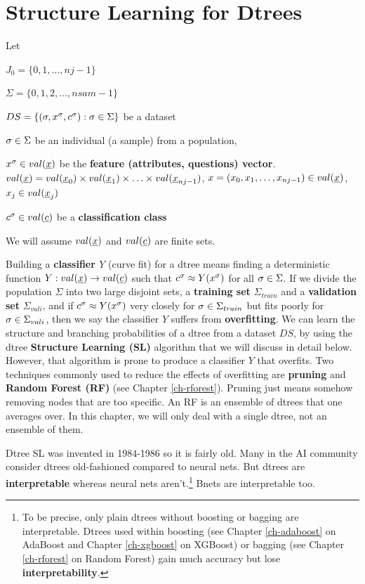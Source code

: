 \section{Structure Learning for  Dtrees}\label{sec-dtree-sl}



Let

$J_0=\{0,1, \ldots, nj-1\}$

$\Sigma=\{0,1,2, \ldots,nsam-1\}$

$DS=\{(\sigma, x^\sigma, c^\sigma): \sigma\in \Sigma\}$ be a dataset

$\sigma\in \Sigma$ be an individual (a sample)
from a population, 

$x^\s\in val(\rvx)$ be the {\bf
feature (attributes, questions) vector}.
$val(\rvx)= val(\rvx_0)\times val(\rvx_1)
\times\ldots\times val(\rvx_{nj-1})$,
$x=(x_0, x_1, \ldots, x_{nj-1})\in val(\rvx)$,
$x_j\in val(\rvx_j)$


$c^\s\in val(\rvc)$ be a {\bf classification class}

We will
assume $val(\rvx)$ and $val(\rvc)$ are finite sets.

Building a {\bf classifier $Y$} 
(curve fit) for a dtree means
finding a deterministic
function $Y:val(\rvx)\rarrow val(\rvc)$
such that 
$c^\sigma \approx Y(x^\sigma)$
for all $\sigma\in \Sigma$.
If we divide
the population
$\Sigma$ 
into two large 
disjoint
sets, a {\bf training set} $\Sigma_{train}$
and a {\bf validation set} $\Sigma_{vali}$,
and if $c^\sigma \approx Y(x^\sigma)$ very closely
for $\sigma\in \Sigma_{train}$
but fits poorly
for $\sigma\in \Sigma_{vali}$,
then we say the classifier  $Y$
suffers from {\bf overfitting}.
We can learn the structure
and branching probabilities of a dtree from a dataset $DS$,
by using the
dtree {\bf Structure Learning (SL)}
algorithm that we will 
discuss in detail below. However,
that algorithm
is prone to produce
a classifier $Y$ that overfits.
Two techniques 
commonly used to 
reduce the effects of overfitting
are {\bf pruning}  and 
{\bf Random Forest (RF)}
(see Chapter \ref{ch-rforest}).
Pruning just means somehow
removing nodes that are
too specific. 
An RF is an ensemble of dtrees 
that one averages over.
In this chapter, we will only deal
with a single dtree,
not an ensemble of them. 

Dtree SL was invented in 1984-1986 so it
is fairly old.
Many in the AI
community 
consider dtrees old-fashioned
compared to neural nets.
But dtrees 
are {\bf interpretable} whereas neural nets aren't.\footnote{
To be precise, only
plain dtrees without boosting or
 bagging
are interpretable.
Dtrees used within boosting
(see Chapter \ref{ch-adaboost} on AdaBoost
and
Chapter \ref{ch-xgboost} on XGBoost)
or bagging
(see Chapter \ref{ch-rforest} on Random Forest)
gain much
accuracy but lose
{\bf interpretability}.}
Bnets are interpretable too.


